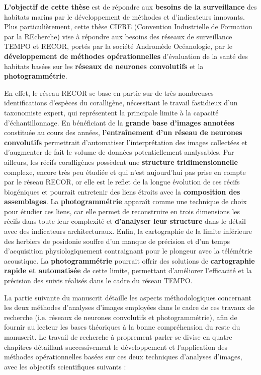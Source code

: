 \textbf{L’objectif de cette thèse} est de répondre aux \textbf{besoins de la surveillance} des habitats marins par le développement de méthodes et d’indicateurs innovants. Plus particulièrement, cette thèse CIFRE (Convention Industrielle de Formation par la REcherche) vise à répondre aux besoins des réseaux de surveillance TEMPO et RECOR, portés par la société Andromède Océanologie, par le \textbf{développement de méthodes opérationnelles} d’évaluation de la santé des habitats basées sur les \textbf{réseaux de neurones convolutifs} et la \textbf{photogrammétrie}. 

En effet, le réseau RECOR se base en partie sur de très nombreuses identifications d’espèces du coralligène, nécessitant le travail fastidieux d’un taxonomiste expert, qui représentent la principale limite à la capacité d’échantillonnage. En bénéficiant de la \textbf{grande base d’images annotées} constituée au cours des années, \textbf{l’entraînement d’un réseau de neurones convolutifs} permettrait d’automatiser l’interprétation des images collectées et d’augmenter de fait le volume de données potentiellement analysables. Par ailleurs, les récifs coralligènes possèdent une \textbf{structure tridimensionnelle} complexe, encore très peu étudiée et qui n’est aujourd’hui pas prise en compte par le réseau RECOR, or elle est le reflet de la longue évolution de ces récifs biogéniques et pourrait entretenir des liens étroits avec la \textbf{composition des assemblages}. La \textbf{photogrammétrie} apparaît comme une technique de choix pour étudier ces liens, car elle permet de reconstruire en trois dimensions les récifs dans toute leur complexité et \textbf{d’analyser leur structure} dans le détail avec des indicateurs architecturaux. Enfin, la cartographie de la limite inférieure des herbiers de posidonie souffre d’un manque de précision et d’un temps d’acquisition physiologiquement contraignant pour le plongeur avec la télémétrie acoustique. La \textbf{photogrammétrie} pourrait offrir des solutions de \textbf{cartographie rapide et automatisée} de cette limite, permettant d’améliorer l’efficacité et la précision des suivis réalisés dans le cadre du réseau TEMPO. 

La partie suivante du manuscrit détaille les aspects méthodologiques concernant les deux méthodes d’analyses d’images employées dans le cadre de ces travaux de recherche (i.e. réseaux de neurones convolutifs et photogrammétrie), afin de fournir au lecteur les bases théoriques à la bonne compréhension du reste du manuscrit. Le travail de recherche à proprement parler se divise en quatre chapitres détaillant successivement le développement et l’application des méthodes opérationnelles basées sur ces deux techniques d’analyses d’images, avec les objectifs scientifiques suivants :

